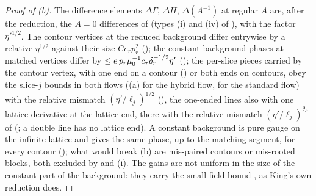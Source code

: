 \begin{proof}[Proof of (b)]
The difference elements $\Delta\Gamma$, $\Delta H$, $\Delta(A^{-1})$ at regular $A$ are, after the reduction, the $A=0$ differences of  (types (i) and (iv) of ), with the factor $\eta'^{1/2}$. The contour vertices at the reduced background differ entrywise by a relative $\eta^{1/2}$ against their size $Ce_rp_r^2$ (); the constant-background phases at matched vertices differ by $\le e\,p_r\mu_0^{-1}c_\tau\delta_r^{-1/2}\eta'$ (); the per-slice pieces carried by the contour vertex, with one end on a contour (\cite[(3.27)]{K1}) or both ends on contours, obey the slice-$j$ bounds \cite[(3.63)--(3.65)]{K1} in both flows ((a) for the hybrid flow, \cite[Prop.~3.7]{K1} for the standard flow) with the relative mismatch $(\eta'/\ell_j)^{1/2}$ (), the one-ended lines also with one lattice derivative at the lattice end, there with the relative mismatch $(\eta'/\ell_j)^{\theta_\partial}$ of  (; a double line has no lattice end). A constant background is pure gauge on the infinite lattice and gives the same phase, up to the matching segment, for every contour (); what would break (b) are mis-paired contours or mis-rooted blocks, both excluded by  and (i). The gains are not uniform in the size of the constant part of the background: they carry the small-field bound \cite[(3.2)]{K1}, as King's own reduction does.
\end{proof}
